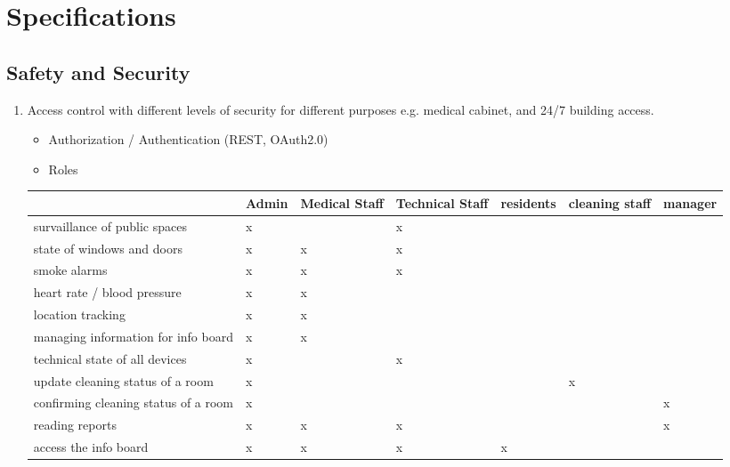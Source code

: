 \section{Specifications}
\label{sec:org1cd7898}

\subsection{Safety and Security}
\label{sec:orgdf376cf}
\begin{enumerate}
\item Access control with different levels of security for different purposes e.g. medical cabinet, and 24/7 building access.
\label{sec:orgfd41c27}
\begin{itemize}
\item Authorization / Authentication (REST, OAuth2.0)
\item Roles
\end{itemize}
\begin{center}
\begin{tabular}{lllllll}
 & Admin & Medical Staff & Technical Staff & residents & cleaning staff & manager\\
\hline
survaillance of public spaces & x &  & x &  &  & \\
state of windows and doors & x & x & x &  &  & \\
smoke alarms & x & x & x &  &  & \\
heart rate / blood pressure & x & x &  &  &  & \\
location tracking & x & x &  &  &  & \\
managing information for info board & x & x &  &  &  & \\
technical state of all devices & x &  & x &  &  & \\
update cleaning status of a room & x &  &  &  & x & \\
confirming cleaning status of a room & x &  &  &  &  & x\\
reading reports & x & x & x &  &  & x\\
access the info board & x & x & x & x &  & \\
\end{tabular}
\end{center}




\end{enumerate}

